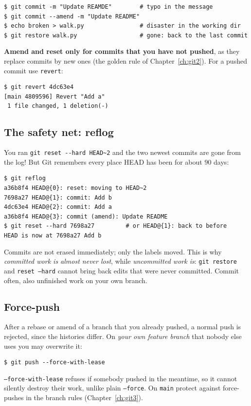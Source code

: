 \begin{verbatim}
$ git commit -m "Update REAMDE"        # typo in the message
$ git commit --amend -m "Update README"
$ echo broken > walk.py                # disaster in the working dir
$ git restore walk.py                  # gone: back to the last commit
\end{verbatim}
\textbf{Amend and reset only for commits that you have not pushed}, as they replace commits by new ones (the golden rule of Chapter~\ref{ch:git2}). For a pushed commit use \texttt{revert}:
\begin{verbatim}
$ git revert 4dc63e4
[main 4809596] Revert "Add a"
 1 file changed, 1 deletion(-)
\end{verbatim}

\subsection*{The safety net: reflog}
You ran \verb!git reset --hard HEAD~2! and the two newest commits are gone from the log! But Git remembers every place HEAD has been for about $90$ days:
\begin{verbatim}
$ git reflog
a36b8f4 HEAD@{0}: reset: moving to HEAD~2
7698a27 HEAD@{1}: commit: Add b
4dc63e4 HEAD@{2}: commit: Add a
a36b8f4 HEAD@{3}: commit (amend): Update README
$ git reset --hard 7698a27         # or HEAD@{1}: back to before
HEAD is now at 7698a27 Add b
\end{verbatim}
Commits are not erased immediately; only the labels moved. This is why \emph{committed work is almost never lost}, while \emph{uncommitted work is}: \texttt{git restore} and \texttt{reset --hard} cannot bring back edits that were never committed. Commit often, also unfinished work on your own branch.

\subsection*{Force-push}
After a rebase or amend of a branch that you already pushed, a normal push is rejected, since the histories differ. On \emph{your own feature branch} that nobody else uses you may overwrite it:
\begin{verbatim}
$ git push --force-with-lease
\end{verbatim}
\texttt{--force-with-lease} refuses if somebody pushed in the meantime, so it cannot silently destroy their work, unlike plain \texttt{--force}. On \texttt{main} protect against force-pushes in the branch rules (Chapter~\ref{ch:git3}).

